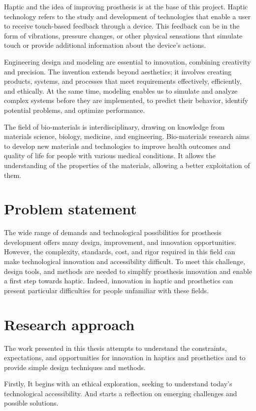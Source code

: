 Haptic and the idea of improving prosthesis is at the base of this project. Haptic technology refers to the study and development of technologies that enable a user to receive touch-based feedback through a device. This feedback can be in the form of vibrations, pressure changes, or other physical sensations that simulate touch or provide additional information about the device's actions.

Engineering design and modeling are essential to innovation, combining creativity and precision. The invention extends beyond aesthetics; it involves creating products, systems, and processes that meet requirements effectively, efficiently, and ethically. At the same time, modeling enables us to simulate and analyze complex systems before they are implemented, to predict their behavior, identify potential problems, and optimize performance.

The field of bio-materials is interdisciplinary, drawing on knowledge from materials science, biology, medicine, and engineering. Bio-materials research aims to develop new materials and technologies to improve health outcomes and quality of life for people with various medical conditions. It allows the understanding of the properties of the materials, allowing a better exploitation of them.

\section{Problem statement}
The wide range of demands and technological possibilities for prosthesis development offers many design, improvement, and innovation opportunities. However, the complexity, standards, cost, and rigor required in this field can make technological innovation and accessibility difficult. To meet this challenge, design tools, and methods are needed to simplify prosthesis innovation and enable a first step towards haptic. Indeed, innovation in haptic and prosthetics can present particular difficulties for people unfamiliar with these fields.

\section{Research approach}
The work presented in this thesis attempts to understand the constraints, expectations, and opportunities for innovation in haptics and prosthetics and to provide simple design techniques and methods.

Firstly, It begins with an ethical exploration, seeking to understand today's technological accessibility. And starts a reflection on emerging challenges and possible solutions.

